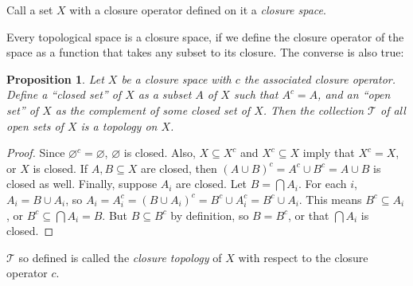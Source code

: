 \documentclass[12pt]{article}
\newtheorem{prop}{Proposition}
\begin{document}
Call a set $X$ with a closure operator defined on it a \emph{closure space}.  

Every topological space is a closure space, if we define the closure operator of the space as a function that takes any subset to its closure.  The converse is also true:

\begin{prop} Let $X$ be a closure space with $c$ the associated closure operator.  Define a ``closed set'' of $X$ as a subset $A$ of $X$ such that $A^c=A$, and an ``open set'' of $X$ as the complement of some closed set of $X$.  Then the collection $\mathcal{T}$ of all open sets of $X$ is a topology on $X$. \end{prop}

\begin{proof}
Since $\varnothing^c=\varnothing$, $\varnothing$ is closed.  Also, $X\subseteq X^c$ and $X^c\subseteq X$ imply that $X^c=X$, or $X$ is closed.  If $A,B\subseteq X$ are closed, then $(A\cup B)^c=A^c\cup B^c=A\cup B$ is closed as well.  Finally, suppose $A_i$ are closed.  Let $B=\bigcap A_i$.  For each $i$, $A_i=B\cup A_i$, so $A_i=A_i^c=(B\cup A_i)^c=B^c\cup A_i^c=B^c\cup A_i$.  This means $B^c\subseteq A_i$, or $B^c\subseteq \bigcap A_i=B$.  But $B\subseteq B^c$ by definition, so $B=B^c$, or that $\bigcap A_i$ is closed.
\end{proof}

$\mathcal{T}$ so defined is called the \emph{closure topology} of $X$ with respect to the closure operator $c$.
\end{document}
